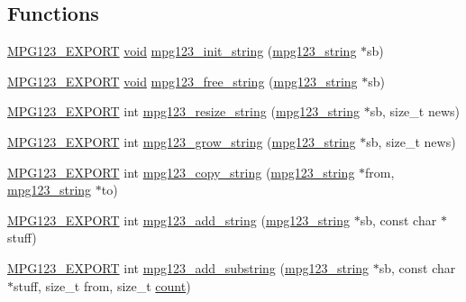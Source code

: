 \subsection*{Functions}
\begin{DoxyCompactItemize}
\item 
\mbox{\hyperlink{mpg123_8h_a2ba98cfba3f760879df70e755b2a61cc}{M\+P\+G123\+\_\+\+E\+X\+P\+O\+RT}} \mbox{\hyperlink{_s_d_l__opengles2__gl2ext_8h_ae5d8fa23ad07c48bb609509eae494c95}{void}} \mbox{\hyperlink{group__mpg123__metadata_gaf0206ccb2574f563bff863a26a3b0025}{mpg123\+\_\+init\+\_\+string}} (\mbox{\hyperlink{structmpg123__string}{mpg123\+\_\+string}} $\ast$sb)
\item 
\mbox{\hyperlink{mpg123_8h_a2ba98cfba3f760879df70e755b2a61cc}{M\+P\+G123\+\_\+\+E\+X\+P\+O\+RT}} \mbox{\hyperlink{_s_d_l__opengles2__gl2ext_8h_ae5d8fa23ad07c48bb609509eae494c95}{void}} \mbox{\hyperlink{group__mpg123__metadata_ga254cfe80f5eb2f2715e36be9a5119aed}{mpg123\+\_\+free\+\_\+string}} (\mbox{\hyperlink{structmpg123__string}{mpg123\+\_\+string}} $\ast$sb)
\item 
\mbox{\hyperlink{mpg123_8h_a2ba98cfba3f760879df70e755b2a61cc}{M\+P\+G123\+\_\+\+E\+X\+P\+O\+RT}} int \mbox{\hyperlink{group__mpg123__metadata_ga57ddead33785908618a5c0c7f3c1895a}{mpg123\+\_\+resize\+\_\+string}} (\mbox{\hyperlink{structmpg123__string}{mpg123\+\_\+string}} $\ast$sb, size\+\_\+t news)
\item 
\mbox{\hyperlink{mpg123_8h_a2ba98cfba3f760879df70e755b2a61cc}{M\+P\+G123\+\_\+\+E\+X\+P\+O\+RT}} int \mbox{\hyperlink{group__mpg123__metadata_ga1125e5a8235c42759d7300797006b05d}{mpg123\+\_\+grow\+\_\+string}} (\mbox{\hyperlink{structmpg123__string}{mpg123\+\_\+string}} $\ast$sb, size\+\_\+t news)
\item 
\mbox{\hyperlink{mpg123_8h_a2ba98cfba3f760879df70e755b2a61cc}{M\+P\+G123\+\_\+\+E\+X\+P\+O\+RT}} int \mbox{\hyperlink{group__mpg123__metadata_ga9d7fe63da5bc665bc754975b293e0a6b}{mpg123\+\_\+copy\+\_\+string}} (\mbox{\hyperlink{structmpg123__string}{mpg123\+\_\+string}} $\ast$from, \mbox{\hyperlink{structmpg123__string}{mpg123\+\_\+string}} $\ast$to)
\item 
\mbox{\hyperlink{mpg123_8h_a2ba98cfba3f760879df70e755b2a61cc}{M\+P\+G123\+\_\+\+E\+X\+P\+O\+RT}} int \mbox{\hyperlink{group__mpg123__metadata_gab54a099feebd65c5fa77d49a8c9c6db5}{mpg123\+\_\+add\+\_\+string}} (\mbox{\hyperlink{structmpg123__string}{mpg123\+\_\+string}} $\ast$sb, const char $\ast$stuff)
\item 
\mbox{\hyperlink{mpg123_8h_a2ba98cfba3f760879df70e755b2a61cc}{M\+P\+G123\+\_\+\+E\+X\+P\+O\+RT}} int \mbox{\hyperlink{group__mpg123__metadata_ga76c2bf2ead81199a750ddff7253371f1}{mpg123\+\_\+add\+\_\+substring}} (\mbox{\hyperlink{structmpg123__string}{mpg123\+\_\+string}} $\ast$sb, const char $\ast$stuff, size\+\_\+t from, size\+\_\+t \mbox{\hyperlink{_s_d_l__opengl_8h_a619bc20e8198de3bd3f3d7fc34de66b2}{count}})

\end{DoxyCompactItemize}
